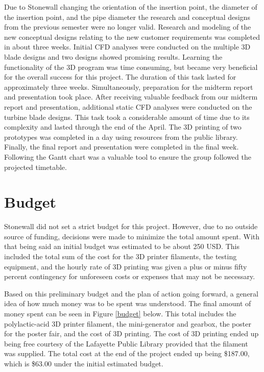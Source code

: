 \documentclass[12pt]{article}
\begin{document}
\hspace{0.5 in}Due to Stonewall changing the orientation of the insertion point, the diameter of the insertion point, and the pipe diameter the research and conceptual designs from the previous semester were no longer valid. Research and modeling of the new conceptual designs relating to the new customer requirements was completed in about three weeks. Initial CFD analyses were conducted on the multiple 3D blade designs and two designs showed promising results. Learning the functionality of the 3D program was time consuming, but became very beneficial for the overall success for this project. The duration of this task lasted for approximately three weeks. Simultaneously, preparation for the midterm report and presentation took place. After receiving valuable feedback from our midterm report and presentation, additional static CFD analyses were conducted on the turbine blade designs. This task took a considerable amount of time due to its complexity and lasted through the end of the April. The 3D printing of two prototypes was completed in a day using resources from the public library. Finally, the final report and presentation were completed in the final week. Following the Gantt chart was a valuable tool to ensure the group followed the projected timetable.
%
%
\vspace{-0.2in}
\section{Budget}
\label{sec:Budget}
\vspace{-0.2in}
\doublespacing

\hspace{0.5 in}Stonewall did not set a strict budget for this project. However, due to no outside source of funding, decisions were made to minimize the total amount spent. With that being said an initial budget was estimated to be about 250 USD. This included the total sum of the cost for the 3D printer filaments, the testing equipment, and the hourly rate of 3D printing was given a plus or minus fifty percent contingency for unforeseen costs or expenses that may not be necessary.
    
Based on this preliminary budget and the plan of action going forward, a general idea of how much money was to be spent was understood. The final amount of money spent can be seen in Figure \ref{budget} below. This total includes the polylactic-acid 3D printer filament, the mini-generator and gearbox, the poster for the poster fair, and the cost of 3D printing. The cost of 3D printing ended up being free courtesy of the Lafayette Public Library provided that the filament was supplied. The total cost at the end of the project ended up being \$187.00, which is \$63.00 under the initial estimated budget.
\end{document}
